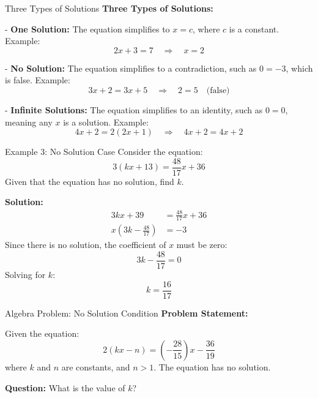 \documentclass{beamer}
\begin{document}


\begin{frame}{Three Types of Solutions}
    \textbf{Three Types of Solutions:}
    
    - \textbf{One Solution:} The equation simplifies to \( x = c \), where \( c \) is a constant. Example:
      \[
      2x + 3 = 7 \quad \Rightarrow \quad x = 2
      \]

      \pause
    
    - \textbf{No Solution:} The equation simplifies to a contradiction, such as \( 0 = -3 \), which is false. Example:
      \[
      3x + 2 = 3x + 5 \quad \Rightarrow \quad 2 = 5 \quad \text{(false)}
      \]

\pause

    - \textbf{Infinite Solutions:} The equation simplifies to an identity, such as \( 0 = 0 \), meaning any \( x \) is a solution. Example:
      \[
      4x + 2 = 2(2x + 1) \quad \Rightarrow \quad 4x + 2 = 4x + 2
      \]
    
\end{frame}

\begin{frame}{Example 3: No Solution Case}
    Consider the equation:
    \[
    3(kx + 13) = \frac{48}{17}x + 36
    \]
    Given that the equation has no solution, find \( k \).

    \pause
    \textbf{Solution:}
    \begin{align*}
        3kx + 39 &= \frac{48}{17}x + 36 \\
        x(3k - \frac{48}{17}) &= -3
    \end{align*}
    Since there is no solution, the coefficient of \( x \) must be zero:
    \[
    3k - \frac{48}{17} = 0
    \]
    Solving for \( k \):
    \[
    k = \frac{16}{17}
    \]
\end{frame}

\begin{frame}{Algebra Problem: No Solution Condition}
    \textbf{Problem Statement:}
    
    Given the equation:
    \[
    2(kx - n) = (-\frac{28}{15}) x - \frac{36}{19}
    \]
    where \( k \) and \( n \) are constants, and \( n > 1 \). The equation has no solution.

    \vspace{0.5cm}
    \textbf{Question:} What is the value of \( k \)?
\end{frame}
\end{document}
